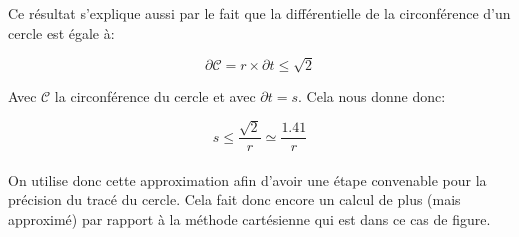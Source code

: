 \documentclass{report}
\begin{document}
Ce résultat s'explique aussi par le fait que la différentielle de la
circonférence d'un cercle est égale à:

\begin{equation}
	\partial \mathcal{C} = r\times\partial t \leq \sqrt{2}
\end{equation}

Avec $\mathcal{C}$ la circonférence du cercle et avec $\partial t = s$. Cela
nous donne donc:

\begin{equation}
	s \leq \dfrac{\sqrt{2}}{r} \simeq \dfrac{1.41}{r}
\end{equation}

\paragraph{} On utilise donc cette approximation afin d'avoir une étape
convenable pour la précision du tracé du cercle. Cela fait donc encore un
calcul de plus (mais approximé) par rapport à la méthode cartésienne qui est
dans ce cas de figure.
\end{document}
